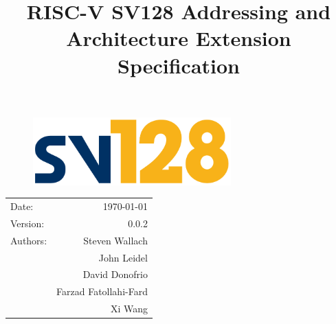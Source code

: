 \documentclass{article}
\title{\textbf{RISC-V SV128 Addressing and\\Architecture Extension Specification}} %
\date{} %
\begin{document}
\begin{figure}
\vspace{2in}
\begin{center}
\includegraphics[width=3in]{figures/sv128.pdf} %
\end{center}
\end{figure}

\maketitle %

\thispagestyle{fancy}

\begin{center}
\begin{tabular}{l r}
Date: & \today \\
Version: & 0.0.2 \\ %
Authors: & Steven Wallach\\
& John Leidel\\
& David Donofrio\\
& Farzad Fatollahi-Fard\\
& Xi Wang
\end{tabular}
\end{center}

\clearpage

\tableofcontents

\clearpage




\clearpage
\listoffigures
\listoftables
\clearpage
\end{document}
